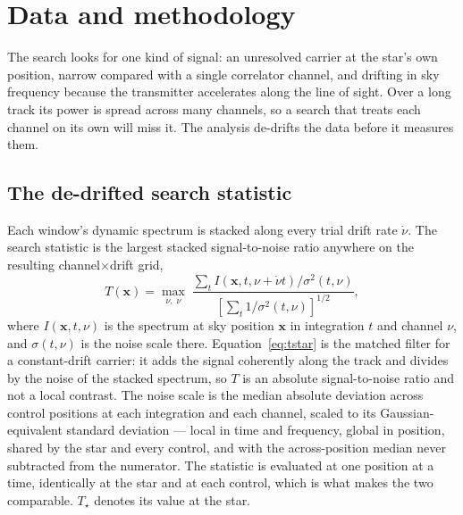 \section{Data and methodology}
\label{sec:method}

The search looks for one kind of signal: an unresolved carrier at the
star's own position, narrow compared with a single correlator channel, and
drifting in sky frequency because the transmitter accelerates along the line
of sight. Over a long track its power is spread across many channels, so a
search that treats each channel on its own will miss it. The analysis
de-drifts the data before it measures them.

\subsection{The de-drifted search statistic}
\label{sec:statistic}

Each window's dynamic spectrum is stacked along every trial drift rate
$\dot\nu$. The search statistic is the largest stacked signal-to-noise
ratio anywhere on the resulting channel$\times$drift grid,
%
\begin{equation}
T(\mathbf{x})=\max_{\dot\nu,\;\nu}\;
\frac{\sum_{t} I\!\left(\mathbf{x},t,\nu+\dot\nu t\right)\big/\sigma^{2}(t,\nu)}
     {\left[\sum_{t}1\big/\sigma^{2}(t,\nu)\right]^{1/2}},
\label{eq:tstar}
\end{equation}
%
where $I(\mathbf{x},t,\nu)$ is the spectrum at sky position $\mathbf{x}$
in integration $t$ and channel $\nu$, and $\sigma(t,\nu)$ is the noise scale
there. Equation~\ref{eq:tstar} is the matched filter for a constant-drift
carrier: it adds the signal coherently along the track and divides by the
noise of the stacked spectrum, so $T$ is an absolute signal-to-noise ratio
and not a local contrast. The noise scale is the median absolute deviation
across \NCtrl{} control positions at each integration and each channel,
scaled to its Gaussian-equivalent standard deviation --- local in time and
frequency, global in position, shared by the star and every control, and with
the across-position median never subtracted from the numerator. The statistic
is evaluated at one position at a time, identically at the star and at each
control, which is what makes the two comparable. $T_\star$ denotes its value
at the star.

